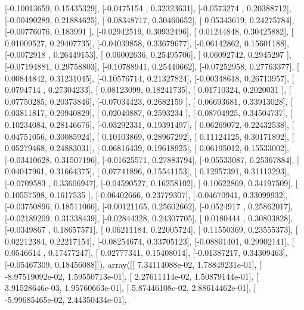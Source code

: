 \documentclass{article}
\begin{document}
       [-0.10013659,  0.15435329],
       [-0.0475154 ,  0.32323631],
       [-0.0573274 ,  0.20388712],
       [-0.00490289,  0.21884625],
       [ 0.08348717,  0.30460652],
       [ 0.05343619,  0.24275784],
       [-0.00776076,  0.183991  ],
       [-0.02942519,  0.30932496],
       [ 0.01244848,  0.30425882],
       [ 0.01009527,  0.29407735],
       [-0.04039858,  0.33679677],
       [-0.06142862,  0.15601188],
       [-0.0072918 ,  0.26449153],
       [ 0.06002636,  0.25495706],
       [ 0.06092742,  0.2945297 ],
       [-0.07194881,  0.29758803],
       [-0.10788941,  0.25440662],
       [-0.07252958,  0.27763377],
       [ 0.00844842,  0.31231045],
       [-0.10576714,  0.21327824],
       [-0.00348618,  0.26713957],
       [ 0.0794714 ,  0.27304233],
       [ 0.08123099,  0.18241735],
       [ 0.01710324,  0.2020031 ],
       [ 0.07750285,  0.20373846],
       [-0.07034423,  0.2682159 ],
       [ 0.06693681,  0.33913028],
       [ 0.03811817,  0.20940829],
       [ 0.02040887,  0.2593234 ],
       [-0.08704925,  0.34504737],
       [ 0.10234084,  0.28146676],
       [-0.03292331,  0.19391497],
       [ 0.06269072,  0.22432538],
       [ 0.04751056,  0.30085924],
       [ 0.10103869,  0.28967292],
       [ 0.11124125,  0.30171892],
       [ 0.05279468,  0.24883031],
       [-0.06816439,  0.19618925],
       [ 0.06195012,  0.15533002],
       [-0.03410628,  0.31507196],
       [-0.01625571,  0.27883794],
       [-0.05533087,  0.25367884],
       [ 0.04047961,  0.31664375],
       [ 0.07741896,  0.15541153],
       [ 0.12957391,  0.31113293],
       [-0.0709583 ,  0.33606947],
       [-0.04590527,  0.16258102],
       [ 0.10622869,  0.34197509],
       [ 0.10557598,  0.1617535 ],
       [-0.06402666,  0.23779307],
       [-0.04670941,  0.33099932],
       [-0.03750896,  0.18511066],
       [-0.00121165,  0.25602662],
       [-0.0524917 ,  0.25862017],
       [-0.02189209,  0.31338439],
       [-0.02844328,  0.24307705],
       [ 0.0180444 ,  0.30803828],
       [-0.0349867 ,  0.18657571],
       [ 0.06211184,  0.22005724],
       [ 0.11550369,  0.23555373],
       [ 0.02212384,  0.22217154],
       [-0.08254674,  0.33705123],
       [-0.08801401,  0.29902141],
       [ 0.0546614 ,  0.17477247],
       [ 0.02777341,  0.15408014],
       [-0.01387217,  0.34309463],
       [-0.05467309,  0.18456088]]), array([[  7.34114088e-02,   1.78849231e-01],
       [ -8.97519092e-02,   1.59550713e-01],
       [  2.27611114e-02,   1.50879144e-01],
       [  3.91528646e-03,   1.95760663e-01],
       [  5.87446108e-02,   2.88614462e-01],
       [ -5.99685465e-02,   2.44350434e-01],
\end{document}
